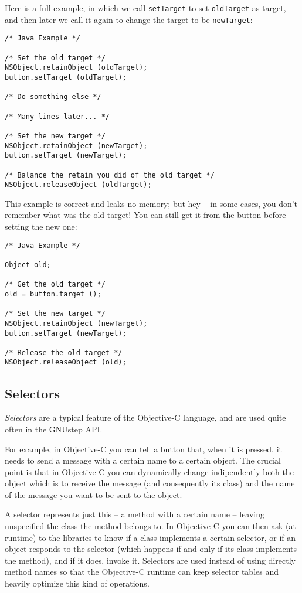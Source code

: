 Here is a full example, in which we call \texttt{setTarget} to set
\texttt{oldTarget} as target, and then later we call it again to
change the target to be \texttt{newTarget}:
\begin{verbatim}
/* Java Example */

/* Set the old target */
NSObject.retainObject (oldTarget);
button.setTarget (oldTarget);

/* Do something else */

/* Many lines later... */

/* Set the new target */
NSObject.retainObject (newTarget);
button.setTarget (newTarget);

/* Balance the retain you did of the old target */
NSObject.releaseObject (oldTarget);
\end{verbatim}
This example is correct and leaks no memory; but hey -- in some cases,
you don't remember what was the old target!  You can still get it from
the button before setting the new one:
\begin{verbatim}
/* Java Example */

Object old;

/* Get the old target */
old = button.target ();

/* Set the new target */
NSObject.retainObject (newTarget);
button.setTarget (newTarget);

/* Release the old target */
NSObject.releaseObject (old);
\end{verbatim}

\subsection{Selectors}

{\sl Selectors} are a typical feature of the Objective-C language, and
are used quite often in the GNUstep API.  

For example, in Objective-C you can tell a button that, when it is
pressed, it needs to send a message with a certain name to a certain
object.  The crucial point is that in Objective-C you can dynamically
change indipendently both the object which is to receive the message
(and consequently its class) and the name of the message you want to
be sent to the object.  

A selector represents just this -- a method with a certain name --
leaving unspecified the class the method belongs to.  In Objective-C
you can then ask (at runtime) to the libraries to know if a class
implements a certain selector, or if an object responds to the
selector (which happens if and only if its class implements the
method), and if it does, invoke it.  Selectors are used instead of
using directly method names so that the Objective-C runtime can keep
selector tables and heavily optimize this kind of operations.

